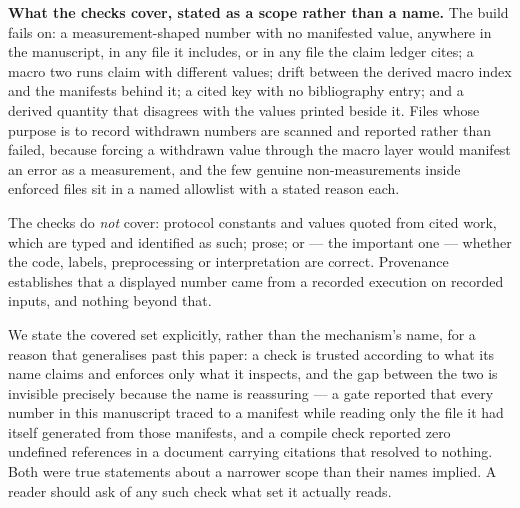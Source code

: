 \documentclass[manuscript,anonymous,review]{acmart}
\begin{document}
\textbf{What the checks cover, stated as a scope rather than a name.} The
build fails on: a measurement-shaped number with no manifested value, anywhere
in the manuscript, in any file it includes, or in any file the claim ledger
cites; a macro two runs claim with different values; drift between the derived
macro index and the manifests behind it; a cited key with no bibliography
entry; and a derived quantity that disagrees with the values printed beside it.
Files whose purpose is to record withdrawn numbers are scanned and reported
rather than failed, because forcing a withdrawn value through the macro layer
would manifest an error as a measurement, and the few genuine non-measurements
inside enforced files sit in a named allowlist with a stated reason each.

The checks do \emph{not} cover: protocol constants and values quoted from
cited work, which are typed and identified as such; prose; or --- the important
one --- whether the code, labels, preprocessing or interpretation are correct.
Provenance establishes that a displayed number came from a recorded execution
on recorded inputs, and nothing beyond that.

We state the covered set explicitly, rather than the mechanism's name, for a
reason that generalises past this paper: a check is trusted according to what
its name claims and enforces only what it inspects, and the gap between the two
is invisible precisely because the name is reassuring --- a gate reported that
every number in this manuscript traced to a manifest while reading only the
file it had itself generated from those manifests, and a compile check reported
zero undefined references in a document carrying citations that resolved to
nothing. Both were true statements about a narrower scope than their names
implied. A reader should ask of any such check what set it actually reads.
\end{document}
